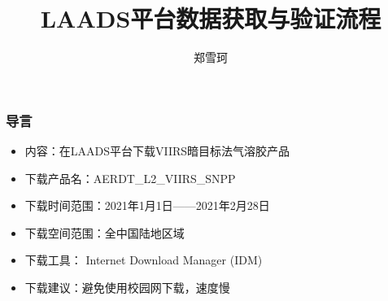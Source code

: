 \documentclass{ctexbeamer}
\title{LAADS平台数据获取与验证流程}
\author{郑雪珂}
\institute{河南理工大学}
\begin{document}
\frame{\titlepage}
\begin{frame}
  \frametitle{导言}
  \begin{itemize}
    \item 内容：在LAADS平台下载VIIRS暗目标法气溶胶产品
    \item 下载产品名：AERDT\_L2\_VIIRS\_SNPP
    \item 下载时间范围：2021年1月1日——2021年2月28日
    \item 下载空间范围：全中国陆地区域
    \item 下载工具： Internet Download Manager (IDM)
    \item 下载建议：避免使用校园网下载，速度慢
  \end{itemize}
\end{frame}



\end{document}
